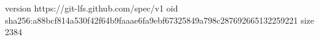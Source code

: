 version https://git-lfs.github.com/spec/v1
oid sha256:a88bcf814a530f42f64b9faaae6fa9ebf67325849a798c287692665132259221
size 2384

